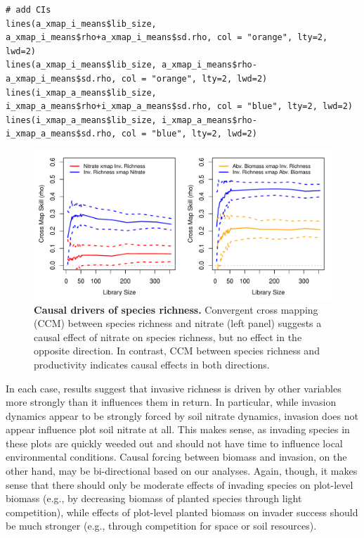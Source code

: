 \begin{lstlisting}
# add CIs
lines(a_xmap_i_means$lib_size, a_xmap_i_means$rho+a_xmap_i_means$sd.rho, col = "orange", lty=2, lwd=2)
lines(a_xmap_i_means$lib_size, a_xmap_i_means$rho-a_xmap_i_means$sd.rho, col = "orange", lty=2, lwd=2)
lines(i_xmap_a_means$lib_size, i_xmap_a_means$rho+i_xmap_a_means$sd.rho, col = "blue", lty=2, lwd=2)
lines(i_xmap_a_means$lib_size, i_xmap_a_means$rho-i_xmap_a_means$sd.rho, col = "blue", lty=2, lwd=2)
\end{lstlisting}

\begin{figure}[!ht]
\begin{center}\includegraphics[width=\maxwidth{\textwidth}]{fig_redm_12.pdf}\end{center}
\caption[Causal drivers of species richness.]{\textbf{Causal drivers of species richness.}\newline
Convergent cross mapping (CCM) between species richness and nitrate (left panel) suggests a causal effect of nitrate on species richness, but no effect in the opposite direction. In contrast, CCM between species richness and productivity indicates causal effects in both directions.}
\end{figure}

In each case, results suggest that invasive richness is driven by other variables more strongly than it influences them in return. In particular, while invasion dynamics appear to be strongly forced by soil nitrate dynamics, invasion does not appear influence plot soil nitrate at all. This makes sense, as invading species in these plots are quickly weeded out and should not have time to influence local environmental conditions. Causal forcing between biomass and invasion, on the other hand, may be bi-directional based on our analyses. Again, though, it makes sense that there should only be moderate effects of invading species on plot-level biomass (e.g., by decreasing biomass of planted species through light competition), while effects of plot-level planted biomass on invader success should be much stronger (e.g., through competition for space or soil resources).

